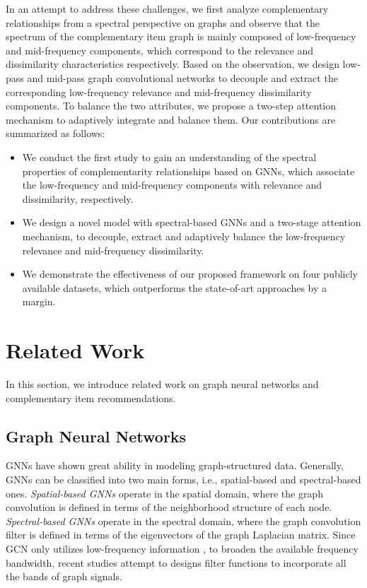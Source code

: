 \documentclass[letterpaper]{article} %
\begin{document}
In an attempt to address these challenges, we first analyze complementary relationships from a spectral perspective on graphs and observe that the spectrum of the complementary item graph is mainly composed of low-frequency and mid-frequency components, which correspond to the relevance and dissimilarity characteristics respectively. Based on the observation, we design low-pass and mid-pass graph convolutional networks to decouple and extract the corresponding low-frequency relevance and mid-frequency dissimilarity components. To balance the two attributes, we propose a two-step attention mechanism to adaptively integrate and balance them. Our contributions are summarized as follows:
\begin{itemize}
    \item We conduct the first study to gain an understanding of the spectral properties of complementarity relationships based on GNNs, which associate the low-frequency and mid-frequency components with relevance and dissimilarity, respectively.
    \item We design a novel model with spectral-based GNNs and a two-stage attention mechanism, to decouple, extract and adaptively balance the low-frequency relevance and mid-frequency dissimilarity.
    \item We demonstrate the effectiveness of our proposed framework on four publicly available datasets, which outperforms the state-of-art approaches by a margin.
\end{itemize}




\section{Related Work}
In this section, we introduce related work on graph neural networks and complementary item recommendations.
\subsection{Graph Neural Networks}






GNNs \cite{wu2020comprehensive} have shown great ability in modeling graph-structured data. Generally, GNNs can be classified into two main forms, i.e., spatial-based and spectral-based ones. \textit{Spatial-based GNNs} \cite{hamilton2017inductive, velivckovic2017graph, gao2018large, zhu2023you} operate in the spatial domain, where the graph convolution is defined in terms of the neighborhood structure of each node.
\textit{Spectral-based GNNs} \cite{bruna2013spectral, defferrard2016convolutional, kipf2016semi, balcilar2020bridging, wu2022beyond} operate in the spectral domain, where the graph convolution filter is defined in terms of the eigenvectors of the graph Laplacian matrix.
Since GCN only utilizes low-frequency information \cite{balcilar2020bridging}, to broaden the available frequency bandwidth, recent studies \cite{balcilar2020bridging, wu2022beyond} attempt to designs filter functions to incorporate all the bands of graph signals.
\end{document}
